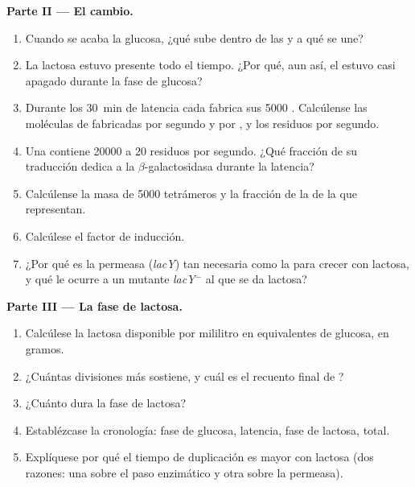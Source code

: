 \begin{problem}
\medskip
\noindent\textbf{Parte II --- El cambio.}
\begin{enumerate}[resume]
  \item Cuando se acaba la glucosa, ¿qué sube dentro de las  y a qué
        se une?
  \item La lactosa estuvo presente todo el tiempo. ¿Por qué, aun así, el
         estuvo casi apagado durante la fase de glucosa?
  \item Durante los \qty{30}{min} de latencia cada  fabrica sus
        \num{5000} . Calcúlense las moléculas de  fabricadas
        por segundo y por , y los residuos por segundo.
  \item Una  contiene \num{20000}  a \qty{20}{} residuos por
        segundo. ¿Qué fracción de su traducción dedica a la
        $\beta$-galactosidasa durante la latencia?
  \item Calcúlense la masa de \num{5000} tetrámeros y la fracción de la
         de la  que representan.
  \item Calcúlese el factor de inducción.
  \item ¿Por qué es la permeasa (\emph{lacY}) tan necesaria como la 
        para crecer con lactosa, y qué le ocurre a un mutante
        \emph{lacY}$^-$ al que se da lactosa?
\end{enumerate}

\medskip
\noindent\textbf{Parte III --- La fase de lactosa.}
\begin{enumerate}[resume]
  \item Calcúlese la lactosa disponible por mililitro en equivalentes de
        glucosa, en gramos.
  \item ¿Cuántas divisiones más sostiene, y cuál es el recuento final de
        ?
  \item ¿Cuánto dura la fase de lactosa?
  \item Establézcase la cronología: fase de glucosa, latencia, fase de
        lactosa, total.
  \item Explíquese por qué el tiempo de duplicación es mayor con lactosa
        (dos razones: una sobre el paso enzimático y otra sobre la
        permeasa).
\end{enumerate}


\end{problem}
